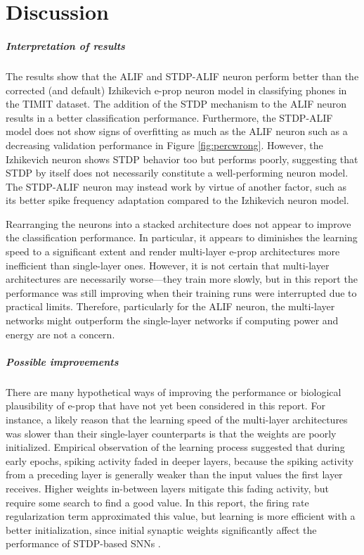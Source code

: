 \chapter{Discussion}\label{ch:discussion}

\paragraph{Interpretation of results}

The results show that the ALIF and STDP-ALIF neuron perform better than the corrected (and default) Izhikevich e-prop neuron model in classifying phones in the TIMIT dataset.
The addition of the STDP mechanism to the ALIF neuron results in a better classification performance.
Furthermore, the STDP-ALIF model does not show signs of overfitting as much as the ALIF neuron such as a decreasing validation performance in Figure \ref{fig:percwrong}.
However, the Izhikevich neuron shows STDP behavior too but performs poorly, suggesting that STDP by itself does not necessarily constitute a well-performing neuron model.
The STDP-ALIF neuron may instead work by virtue of another factor, such as its better spike frequency adaptation compared to the Izhikevich neuron model.

Rearranging the neurons into a stacked architecture does not appear to improve the classification performance.
In particular, it appears to diminishes the learning speed to a significant extent and render multi-layer e-prop architectures more inefficient than single-layer ones.
However, it is not certain that multi-layer architectures are necessarily worse---they train more slowly, but in this report the performance was still improving when their training runs were interrupted due to practical limits.
Therefore, particularly for the ALIF neuron, the multi-layer networks might outperform the single-layer networks if computing power and energy are not a concern.

\paragraph{Possible improvements}
    There are many hypothetical ways of improving the performance or biological plausibility of e-prop that have not yet been considered in this report.
    For instance, a likely reason that the learning speed of the multi-layer architectures was slower than their single-layer counterparts is that the weights are poorly initialized.
    Empirical observation of the learning process suggested that during early epochs, spiking activity faded in deeper layers, because the spiking activity from a preceding layer is generally weaker than the input values the first layer receives.
    Higher weights in-between layers mitigate this fading activity, but require some search to find a good value.
    In this report, the firing rate regularization term approximated this value, but learning is more efficient with a better initialization, since initial synaptic weights significantly affect the performance of STDP-based SNNs \citep{kim2020initial}.

